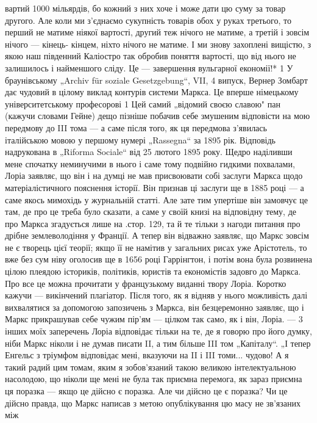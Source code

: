 \parcont{}  %
вартий 1000 мільярдів, бо кожний з них хоче і може дати цю суму за товар другого. Але коли ми з'єднаємо сукупність товарів
обох у руках третього, то перший не матиме ніякої вартості, другий теж нічого не матиме, а третій і зовсім нічого — кінець-
кінцем, ніхто нічого не матиме. І ми знову захоплені вищістю, з якою наш південний Каліостро так обробив поняття вартості,
що від нього не залишилось і найменшого сліду. Це — завершення вульгарної економії!* 1 У браунівському „Archiv für soziale
Gesetzgebung“, VII, 4 випуск, Вернер Зомбарт дає чудовий в цілому виклад контурів системи Маркса. Це вперше німецькому університетському професорові
1 Цей самий „відомий своєю славою" пан (кажучи словами Гейне) дещо пізніше побачив себе змушеним відповісти на мою передмову
до III тома — а саме після того, як ця передмова з’явилась італійською мовою у першому нумері „Rassegna“ за 1895 рік.
Відповідь надрукована в „Riforma Sociale“ від 25 лютого 1895 року. Щедро наділивши мене спочатку неминучими в нього і саме
тому подвійно гидкими похвалами, Лоріа заявляє, що він і на думці не мав присвоювати собі заслуги Маркса щодо
матеріалістичного пояснення історії. Він признав ці заслуги ще в 1885 році — а саме якось мимохідь у журнальній статті. Але
зате тим упертіше він замовчує це там, де про це треба було сказати, а саме у своїй книзі на відповідну тему, де про Маркса
згадується лише на .стор. 129, та й те тільки з нагоди питання про дрібне землеволодіння у Франції. А тепер він відважно
заявляє, що Маркс зовсім не є творець цієї теорії; якщо її не намітив у загальних рисах уже Арістотель, то вже без сум ніву
оголосив ще в 1656 році Гаррінгтон, і потім вона була розвинена цілою плеядою істориків, політиків, юристів та економістів
задовго до Маркса. Про все це можна прочитати у французькому виданні твору Лоріа. Коротко кажучи — викінчений плагіатор.
Після того, як я відняв у нього можливість далі вихвалятися за допомогою запозичень з Маркса, він безцеремонно заявляє, що і
Маркс прикрашував себе чужим пір’ям — цілком так само, як і він, Лоріа. — 3 інших моїх заперечень Лоріа відповідає тільки на
те, де я говорю про його думку, ніби Маркс ніколи і не думав писати II, а тим більше III том „Капіталу“. „І тепер Енгельс з
тріумфом відповідає мені, вказуючи на II і III томи... чудово! А я такий радий цим томам, яким я зобов’язаний такою великою
інтелектуальною насолодою, що ніколи ще мені не була так приємна перемога, як зараз приємна ця поразка — якщо це дійсно є
поразка. Але чи дійсно це є поразка? Чи це дійсно правда, що Маркс написав з метою опублікування цю масу не зв’язаних між
